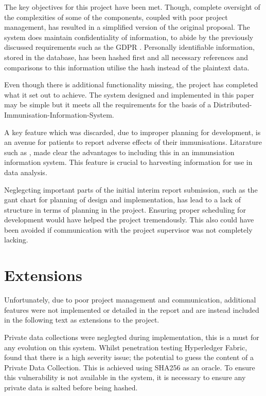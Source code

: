 

The key objectives for this project have been met. 
Though, complete oversight of the complexities of some of the components, coupled with poor project management, has resulted in a simplified version of the original proposal. 
The system does maintain confidentiality of information, to abide by the previously discussed requirements such as the GDPR \cite{noauthor_general_nodate}.
Personally identifiable information, stored in the database, has been hashed first and all necessary references and comparisons to this information utilise the hash instead of the plaintext data. 

Even though there is additional functionality missing, the project has completed what it set out to achieve. 
The system designed and implemented in this paper may be simple but it meets all the requirements for the basis of a Distributed-Immunisation-Information-System.

A key feature which was discarded, due to improper planning for development, is an avenue for patients to report adverse effects of their immunisations. 
Litarature such as \cite{european_centre_for_disease_prevention_and_control_designing_2018}, made clear the advantages to including this in an immunsiation information system. 
This feature is crucial to harvesting information for use in data analysis.

Neglegcting important parts of the initial interim report submission, such as the gant chart for planning of design and implementation, has lead to a lack of structure in terms of planning in the project.
Ensuring proper scheduling for development would have helped the project tremendously. 
This also could have been avoided if communication with the project supervisor was not completely lacking.

\section{Extensions}
Unfortunately, due to poor project management and communication, additional features were not implemented or detailed in the report and are instead included in the following text as extensions to the project.

Private data collections were neglegted during implementation, this is a must for any evolution on this system.
Whilst penetration testing Hyperledger Fabric, \cite{shaw_penetration_2019} found that there is a high severity issue; the potential to guess the content of a Private Data Collection.
This is achieved using SHA256 as an oracle. To ensure this vulnerability is not available in the system, it is necessary to ensure any private data is salted before being hashed. 

